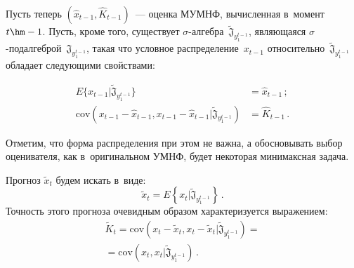 \begin{multicols}{2}
    Пусть теперь $(\hat{x}_{t-1}, \hat{K}_{t-1})$~--- оценка МУМНФ, 
вычисленная в~момент $t\hm-1$. Пусть, кроме того, существует  
$\sigma$-ал\-геб\-ра~$\tilde{\mathfrak{J}}_{y_1^{t-1}}$, являющаяся  
$\sigma$-под\-ал\-геб\-рой~$\mathfrak{J}_{y_1^{t-1}}$, такая что условное распределение~$x_{t-1}$ 
относительно~$\tilde{\mathfrak{J}}_{y_1^{t-1}}$ обладает следующими 
свойствами: 

\vspace*{-9pt}

\noindent
\begin{align*}
E\{ x_{t-1}\vert \tilde{\mathfrak{J}}_{y_1^{t-1}} \}& = 
\hat{x}_{t-1}\,;\\
\mathrm{cov}\left (x_{t-1} - \hat{x}_{t-1}, x_{t-1}- \hat{x}_{t-1} \vert 
\tilde{\mathfrak{J}}_{y_1^{t-1}}\right)&= \hat{K}_{t-1}\,.
\end{align*}

\noindent
 Отметим, что форма 
распределения при этом не важна, а обосновывать выбор оценивателя, как 
в~оригинальном УМНФ, будет некоторая минимаксная задача.
    
    Прогноз $\tilde{x}_t$ будем искать в~виде:
    \begin{equation}
    \tilde{x}_t=E\left\{ x_t\vert \tilde{\mathfrak{J}}_{y_1^{t-1}} \right\}\,.
    \label{e8-bos}
    \end{equation}
        Точность этого прогноза очевидным образом характеризуется выражением:
    \begin{multline}
    \tilde{K}_t=\mathrm{cov} \left( x_t-\tilde{x}_t, x_t-\tilde{x}_t\vert 
\tilde{\mathfrak{J}}_{y_1^{t-1}}\right) ={}\\
{}=\mathrm{cov} \left(  x_t, x_t\vert  \tilde{\mathfrak{J}}_{y_1^{t-1}}\right)\,.
    \label{e9-bos}
    \end{multline}
    

\end{multicols}
